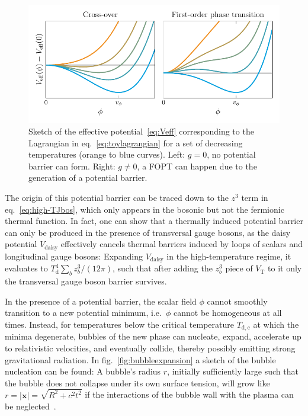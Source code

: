 \begin{figure}[t]
	\centering
	\includegraphics[width=\linewidth]{thesisplots/eff_pot/eff_potential}
	\caption{Sketch of the effective potential~\eqref{eq:Veff} corresponding to the Lagrangian in eq.~\eqref{eq:toylagrangian} for a set of decreasing temperatures (orange to blue curves). Left: $g = 0$, no potential barrier can form. Right: $g \neq 0$, a \ac{FOPT} can happen due to the generation of a potential barrier.}
	\label{fig:effpotential}
\end{figure}

The origin of this potential barrier can be traced down to the $z^3$ term in eq.~\eqref{eq:high-TJbos}, which only appears in the bosonic but not the fermionic thermal function. In fact, one can show that a thermally induced potential barrier can only be produced in the presence of transversal gauge bosons, as the daisy potential $V_\text{daisy}$ effectively cancels thermal barriers induced by  loops of scalars and longitudinal gauge bosons: Expanding $V_\text{daisy}$ in the high-temperature regime, it evaluates to $T_\text{d}^4 \sum_b z^3_b /(12 \pi)$, such that after adding the $z_b^3$ piece of $V_\text{T}$ to it only the transversal gauge boson barrier survives.

In the presence of a potential barrier, the scalar field $\phi$ cannot smoothly transition to a new potential minimum, i.e.~$\phi$ cannot be homogeneous at all times. Instead, for temperatures below the critical temperature $T_\mathrm{d,c}$ at which the minima degenerate, bubbles of the new phase can nucleate, expand, accelerate up to relativistic velocities, and eventually  collide, thereby possibly emitting strong gravitational radiation. In fig.~\ref{fig:bubbleexpansion} a sketch of the bubble nucleation can be found: A bubble's radius $r$, initially sufficiently large such that the bubble does not collapse under its own surface tension, will grow like $r  = \left|\mathbf{x}\right| = \sqrt{R^2 + c^2 t^2}$ if the interactions of the bubble wall with the plasma can be neglected~\cite{Linde:1980tt, Linde:1981zj}.

